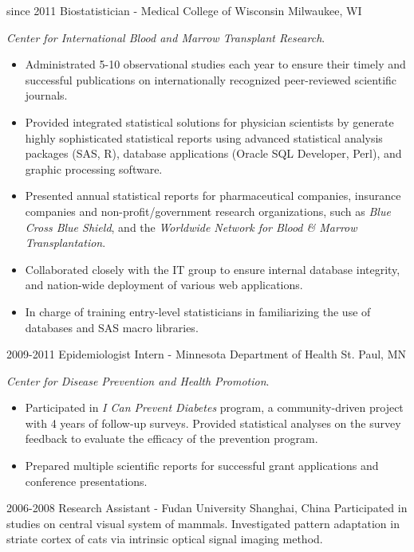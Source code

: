 \documentclass[11pt, print]{friggeri-cv}
\begin{document}
\begin{entrylist}
  \entry
    {since 2011}
    {Biostatistician - Medical College of Wisconsin}
    {Milwaukee, WI}
    {
    \textit{Center for International Blood and Marrow Transplant Research}.
    \begin{itemize}
      \item Administrated 5-10 observational studies each year to ensure their timely and successful publications on internationally recognized peer-reviewed scientific journals.
      \item Provided integrated statistical solutions for physician scientists by generate highly sophisticated statistical reports using advanced statistical analysis packages (SAS, R), database applications (Oracle SQL Developer, Perl), and graphic processing software.
      \item Presented annual statistical reports for pharmaceutical companies, insurance companies and non-profit/government research organizations, such as \textit{Blue Cross Blue Shield}, and the \textit{Worldwide Network for Blood \& Marrow Transplantation}.
      \item Collaborated closely with the IT group to ensure internal database integrity, and nation-wide deployment of various web applications.
      \item In charge of training entry-level statisticians in familiarizing the use of databases and SAS macro libraries.
    \end{itemize}
    }
  \entry
    {2009-2011}
    {Epidemiologist Intern - Minnesota Department of Health}
    {St. Paul, MN}
    {
    \textit{Center for Disease Prevention and Health Promotion}.
    \begin{itemize}
      \item Participated in \textit{I Can Prevent Diabetes} program, a community-driven project with 4 years of follow-up surveys. Provided statistical analyses on the survey feedback to evaluate the efficacy of the prevention program.
      \item Prepared multiple scientific reports for successful grant applications and conference presentations.
    \end{itemize}
    }
  \entry
    {2006-2008}
    {Research Assistant - Fudan University}
    {Shanghai, China}
    {Participated in studies on central visual system of mammals. Investigated pattern adaptation in striate cortex of cats via intrinsic optical signal imaging method.}
\end{entrylist}
\end{document}
